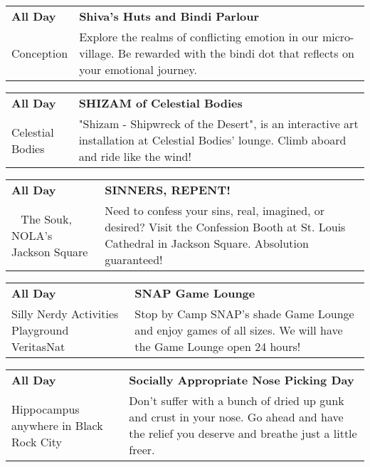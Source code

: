 \begin{tabular}{ p{1in} p{2.2in} }
    \textbf{All Day} & \textbf{Shiva's Huts and Bindi Parlour} \\
    Conception \newline  & Explore the realms of conflicting emotion in our micro-village.  Be rewarded with the bindi dot that reflects on your emotional journey. \\
    \hline 
\end{tabular}
    
\begin{tabular}{ p{1in} p{2.2in} }
    \textbf{All Day} & \textbf{SHIZAM of Celestial Bodies} \\
    Celestial Bodies \newline  & "Shizam - Shipwreck of the Desert", is an interactive art installation at Celestial Bodies' lounge. Climb aboard and ride like the wind! \\
    \hline 
\end{tabular}
    
\begin{tabular}{ p{1in} p{2.2in} }
    \textbf{All Day} & \textbf{SINNERS, REPENT!} \\
    ~ \newline The Souk, NOLA's Jackson Square  & Need to confess your sins, real, imagined, or desired? Visit the Confession Booth at St. Louis Cathedral in Jackson Square. Absolution guaranteed! \\
    \hline 
\end{tabular}
    
\begin{tabular}{ p{1in} p{2.2in} }
    \textbf{All Day} & \textbf{SNAP Game Lounge} \\
    Silly Nerdy Activities Playground \newline VeritasNat & Stop by Camp SNAP's shade Game Lounge and enjoy games of all sizes. We will have the Game Lounge open 24 hours! \\
    \hline 
\end{tabular}
    
\begin{tabular}{ p{1in} p{2.2in} }
    \textbf{All Day} & \textbf{Socially Appropriate Nose Picking Day} \\
    Hippocampus \newline anywhere in Black Rock City & Don't suffer with a bunch of dried up gunk and crust in your nose. Go ahead and have the relief you deserve and breathe just a little freer. \\
    \hline 
\end{tabular}
    
